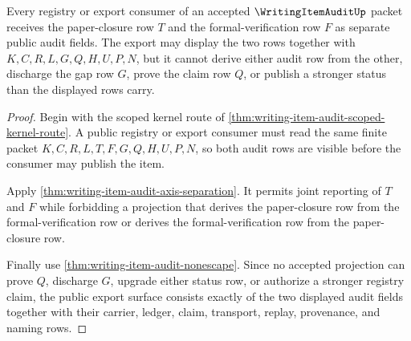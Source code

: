 \begin{theorem}
\label{thm:writing-item-audit-public-axis-export}
Every registry or export consumer of an accepted $\WritingItemAuditUp$ packet receives the paper-closure row $T$ and the formal-verification row $F$ as separate public audit fields. The export may display the two rows together with $K,C,R,L,G,Q,H,U,P,N$, but it cannot derive either audit row from the other, discharge the gap row $G$, prove the claim row $Q$, or publish a stronger status than the displayed rows carry.
\end{theorem}
\begin{proof}
Begin with the scoped kernel route of \autoref{thm:writing-item-audit-scoped-kernel-route}. A public registry or export consumer must read the same finite packet $K,C,R,L,T,F,G,Q,H,U,P,N$, so both audit rows are visible before the consumer may publish the item.

Apply \autoref{thm:writing-item-audit-axis-separation}. It permits joint reporting of $T$ and $F$ while forbidding a projection that derives the paper-closure row from the formal-verification row or derives the formal-verification row from the paper-closure row.

Finally use \autoref{thm:writing-item-audit-nonescape}. Since no accepted projection can prove $Q$, discharge $G$, upgrade either status row, or authorize a stronger registry claim, the public export surface consists exactly of the two displayed audit fields together with their carrier, ledger, claim, transport, replay, provenance, and naming rows.
\end{proof}

